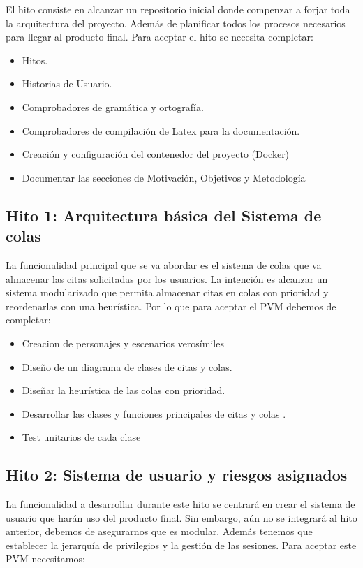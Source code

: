El hito consiste en alcanzar un repositorio inicial donde compenzar a forjar toda la arquitectura del proyecto.
Además de planificar todos los procesos necesarios para llegar al producto final. Para aceptar el hito se necesita completar:

\begin{itemize}
    \item{Hitos.}
    \item{Historias de Usuario.}
    \item{Comprobadores de gramática y ortografía.}
    \item{Comprobadores de compilación de Latex para la documentación.}
    \item{Creación y configuración del contenedor del proyecto (Docker)}
    \item{Documentar las secciones de Motivación, Objetivos y Metodología}
\end{itemize}

\subsection*{Hito 1: Arquitectura básica del Sistema de colas}

La funcionalidad principal que se va abordar es el sistema de colas que va almacenar las citas solicitadas por los usuarios.
La intención es alcanzar un sistema modularizado que permita almacenar citas en colas con prioridad y reordenarlas con una heurística.
Por lo que para aceptar el PVM debemos de completar: 

\begin{itemize}
    \item{Creacion de personajes y escenarios verosímiles}
    \item{Diseño de un diagrama de clases de citas y colas.}
    \item{Diseñar la heurística de las colas con prioridad.}
    \item{Desarrollar las clases y funciones principales de citas y colas .}
    \item{Test unitarios de cada clase}    
\end{itemize}

\subsection*{Hito 2: Sistema de usuario y riesgos asignados}

La funcionalidad a desarrollar durante este hito se centrará en crear el sistema de usuario que harán uso del producto final.
Sin embargo, aún no se integrará al hito anterior, debemos de asegurarnos que es modular. Además tenemos que establecer la 
jerarquía de privilegios y la gestión de las sesiones. 
Para aceptar este PVM necesitamos: 

